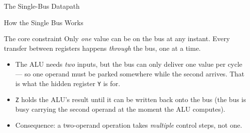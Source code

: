 \documentclass[aspectratio=169]{beamer}
\begin{document}
\begin{frame}{The Single-Bus Datapath}
\begin{center}
  \end{center}
  \cite{Mano1993_computer_system_architecture}
\end{frame}

\begin{frame}{How the Single Bus Works}
  \begin{block}{The core constraint}
    Only \emph{one} value can be on the bus at any instant. Every transfer between
    registers happens \emph{through} the bus, one at a time.
  \end{block}
  \begin{itemize}
    \item The ALU needs \emph{two} inputs, but the bus can only deliver one value
      per cycle --- so one operand must be parked somewhere while the second
      arrives. That is what the hidden register \texttt{Y} is for.
    \item \texttt{Z} holds the ALU's result until it can be written back onto the
      bus (the bus is busy carrying the second operand at the moment the ALU computes).
    \item Consequence: a two-operand operation takes \emph{multiple} control steps,
      not one.
  \end{itemize}
\end{frame}
\end{document}

